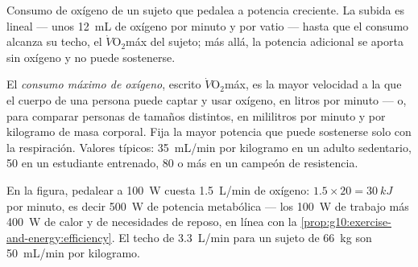\begin{omfigure}

{\small Consumo de oxígeno de un sujeto que pedalea a potencia
creciente. La subida es lineal --- unos \qty{12}{mL} de oxígeno por
minuto y por vatio --- hasta que el consumo alcanza su techo, el
$\dot V\!\mathrm{O_2}$máx del sujeto; más allá, la potencia adicional
se aporta sin oxígeno y no puede sostenerse.}
\end{omfigure}

\begin{definition}\label{def:g10:exercise-and-energy:vo2max}
El \emph{consumo máximo de oxígeno},
escrito $\dot V\!\mathrm{O_2}$máx, es la mayor velocidad a la que el
cuerpo de una persona puede captar y usar oxígeno, en litros por minuto
--- o, para comparar personas de tamaños distintos, en mililitros por
minuto y por kilogramo de masa corporal. Fija la mayor potencia que
puede sostenerse solo con la respiración. Valores típicos:
\qty{35}{mL/min} por kilogramo en un adulto sedentario, \num{50} en un
estudiante entrenado, \num{80} o más en un campeón de resistencia.
\end{definition}

\begin{example}\label{ex:g10:exercise-and-energy:reading}
En la figura, pedalear a \qty{100}{W} cuesta \qty{1.5}{L/min} de
oxígeno: $1.5 \times 20 = \qty{30}{kJ}$ por minuto, es decir
\qty{500}{W} de potencia metabólica --- los \qty{100}{W} de trabajo más
\qty{400}{W} de calor y de necesidades de reposo, en línea con la
\cref{prop:g10:exercise-and-energy:efficiency}. El techo de
\qty{3.3}{L/min} para un sujeto de \qty{66}{kg} son \qty{50}{mL/min}
por kilogramo.
\end{example}

